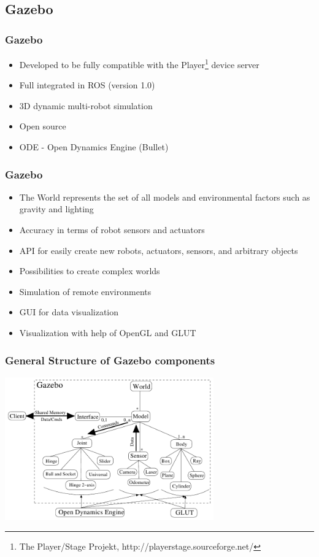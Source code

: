 \subsection{Gazebo} %
\begin{frame}
  \frametitle{Gazebo}
\begin{itemize}
    \item Developed to be fully compatible with the Player\footnote{The Player/Stage Projekt, http://playerstage.sourceforge.net/} device server
    \item Full integrated in ROS (version 1.0)
    \item 3D dynamic multi-robot simulation
    \item Open source
    \item ODE -  Open Dynamics Engine (Bullet)

   
\end{itemize}
\end{frame}

\begin{frame}
  \frametitle{Gazebo}
\begin{itemize}
    \item The World represents the set of all models and environmental factors such as gravity and lighting
    \item Accuracy in terms of robot sensors and actuators
    \item API for easily create new robots, actuators, sensors, and arbitrary objects
    \item Possibilities to create complex worlds
    \item Simulation of remote environments
    \item GUI for data visualization
    \item Visualization with help of OpenGL and GLUT
    
\end{itemize}
\end{frame}

\begin{frame}
  \frametitle{General Structure of Gazebo components}
\includegraphics[width=9cm]{img/gazebo_struktur.png}
\end{frame}

